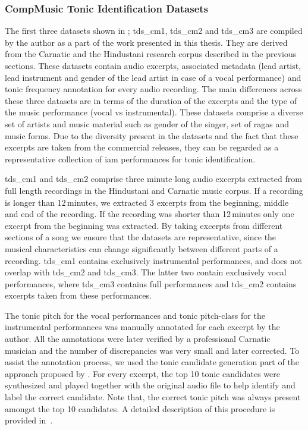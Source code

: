 {%


\subsubsection{CompMusic Tonic Identification Datasets}
\label{sec:corpus_compmusic_tonic_dataset}

The first three datasets shown in ; \acrshort{tds_cm1}, \acrshort{tds_cm2} and \acrshort{tds_cm3} are compiled by the author as a part of the work presented in this thesis. They are derived from the Carnatic and the Hindustani research corpus described in the previous sections. These datasets contain audio excerpts, associated metadata (lead artist, lead instrument and gender of the lead artist in case of a vocal performance) and tonic frequency annotation for every audio recording. The main differences across these three datasets are in terms of the duration of the excerpts and the type of the music performance (vocal vs instrumental). These datasets comprise a diverse set of artists and music material such as gender of the singer, set of \glspl{raga} and music forms. Due to the diversity present in the datasets and the fact that these excerpts are taken from the commercial releases, they can be regarded as a representative collection of \gls{iam} performances for tonic identification.  

\acrshort{tds_cm1} and \acrshort{tds_cm2} comprise three minute long audio excerpts extracted from full length recordings in the Hindustani and Carnatic music corpus. If a recording is longer than 12\,minutes, we extracted 3 excerpts from the beginning, middle and end of the recording. If the recording was shorter than 12\,minutes only one excerpt from the beginning was extracted. By taking excerpts from different sections of a song we ensure that the datasets are representative, since the musical characteristics can change significantly between different parts of a recording. \acrshort{tds_cm1} contains exclusively instrumental performances, and does not overlap with \acrshort{tds_cm2} and \acrshort{tds_cm3}. The latter two contain exclusively vocal performances, where \acrshort{tds_cm3} contains full performances and \acrshort{tds_cm2} contains excerpts taken from these performances. 

The tonic pitch for the vocal performances and tonic pitch-class for the instrumental performances was manually annotated for each excerpt by the author. All the annotations were later verified by a professional Carnatic musician and the number of discrepancies was very small and later corrected. To assist the annotation process, we used the tonic candidate generation part of the approach proposed by \cite{salamon2012multipitch}. For every excerpt, the top 10 tonic candidates were synthesized and played together with the original audio file to help identify and label the correct candidate. Note that, the correct tonic pitch was always present amongst the top 10 candidates. A detailed description of this procedure is provided in~\cite{SGulati_MThesis2012}.

}
